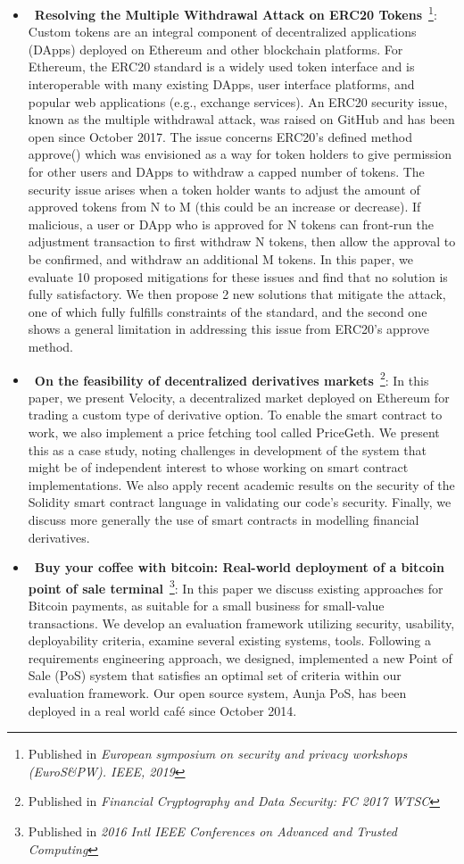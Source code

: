 \begin{itemize}
    \item{~\textbf{Resolving the Multiple Withdrawal Attack on ERC20 Tokens}~\cite{rahimian2019resolving}\footnote{Published in \textit{European symposium on security and privacy workshops (EuroS\&PW). IEEE, 2019}}}: Custom tokens are an integral component of decentralized applications (DApps) deployed on Ethereum and other blockchain platforms. For Ethereum, the ERC20 standard is a widely used token interface and is interoperable with many existing DApps, user interface platforms, and popular web applications (e.g., exchange services). An ERC20 security issue, known as the multiple withdrawal attack, was raised on GitHub and has been open since October 2017. The issue concerns ERC20's defined method approve() which was envisioned as a way for token holders to give permission for other users and DApps to withdraw a capped number of tokens. The security issue arises when a token holder wants to adjust the amount of approved tokens from N to M (this could be an increase or decrease). If malicious, a user or DApp who is approved for N tokens can front-run the adjustment transaction to first withdraw N tokens, then allow the approval to be confirmed, and withdraw an additional M tokens. In this paper, we evaluate 10 proposed mitigations for these issues and find that no solution is fully satisfactory. We then propose 2 new solutions that mitigate the attack, one of which fully fulfills constraints of the standard, and the second one shows a general limitation in addressing this issue from ERC20’s approve method.


    \item{~\textbf{On the feasibility of decentralized derivatives markets}~\cite{eskandari2017feasibility}\footnote{Published in \textit{Financial Cryptography and Data Security: FC 2017 WTSC}}}: In this paper, we present Velocity, a decentralized market deployed on Ethereum for trading a custom type of derivative option. To enable the smart contract to work, we also implement a price fetching tool called PriceGeth. We present this as a case study, noting challenges in development of the system that might be of independent interest to whose working on smart contract implementations. We also apply recent academic results on the security of the Solidity smart contract language in validating our code’s security. Finally, we discuss more generally the use of smart contracts in modelling financial derivatives.

    \item{~\textbf{Buy your coffee with bitcoin: Real-world deployment of a bitcoin point of sale terminal}~\cite{eskandari2016buy}\footnote{Published in \textit{2016 Intl IEEE Conferences on Advanced and Trusted Computing}}}: In this paper we discuss existing approaches for Bitcoin payments, as suitable for a small business for small-value transactions. We develop an evaluation framework utilizing security, usability, deployability criteria, examine several existing systems, tools. Following a requirements engineering approach, we designed, implemented a new Point of Sale (PoS) system that satisfies an optimal set of criteria within our evaluation framework. Our open source system, Aunja PoS, has been deployed in a real world café since October 2014.


\end{itemize}
